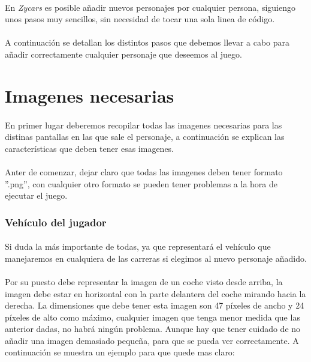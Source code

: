 \paragraph{}
En \emph{Zycars} es posible añadir nuevos personajes por cualquier persona, siguiengo unos pasos muy sencillos,
sin necesidad de tocar una sola linea de código.

\paragraph{}
A continuación se detallan los distintos pasos que debemos llevar a cabo para añadir correctamente cualquier personaje que deseemos
al juego.

\section{Imagenes necesarias}

\paragraph{}
En primer lugar deberemos recopilar todas las imagenes necesarias para las distinas pantallas en las que sale el personaje, a 
continuación se explican las características que deben tener esas imagenes.

\paragraph{}
Anter de comenzar, dejar claro que todas las imagenes deben tener formato ''.png'', con cualquier otro formato se pueden tener 
problemas a la hora de ejecutar el juego.

\subsubsection{Vehículo del jugador}

\paragraph{}
Si duda la más importante de todas, ya que representará el vehículo que manejaremos en cualquiera de las carreras si elegimos al 
nuevo personaje añadido.

\paragraph{}
Por su puesto debe representar la imagen de un coche visto desde arriba, la imagen debe estar en horizontal con la parte delantera
del coche mirando hacia la derecha. La dimensiones que debe tener esta imagen son 47 píxeles de ancho y 24 píxeles de alto como 
máximo, cualquier imagen que tenga menor medida que las anterior dadas, no habrá ningún problema. Aunque hay que tener cuidado de no
añadir una imagen demasiado pequeña, para que se pueda ver correctamente. A continuación se muestra un ejemplo para que quede mas 
claro:

